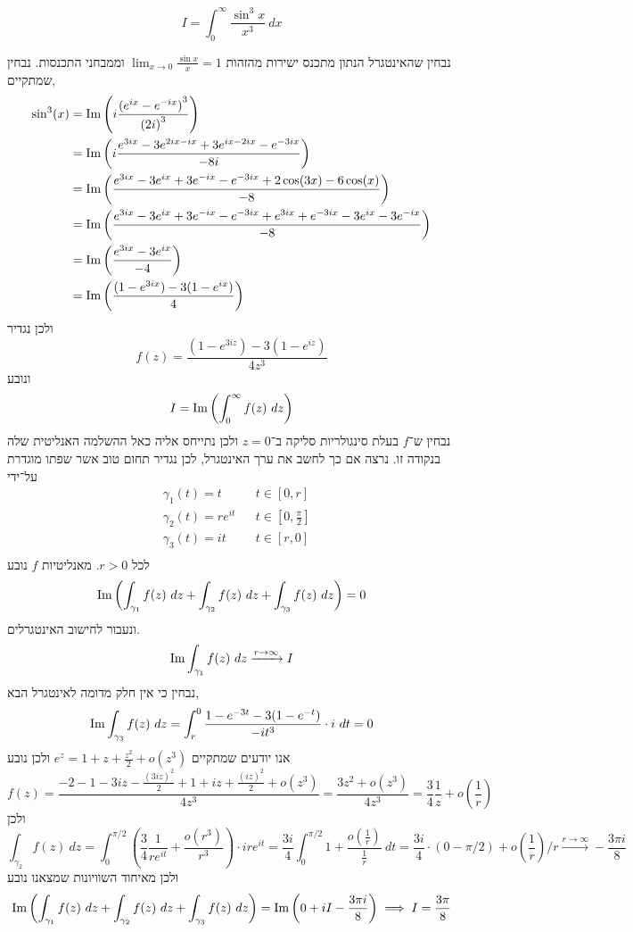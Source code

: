 \subquestion{}
\[
	I = \int_{0}^{\infty} \frac{\sin^3 x}{x^3}\ dx
\]
\begin{solution}
	נבחין שהאינטגרל הנתון מתכנס ישירות מהזהות $\lim_{x \to 0} \frac{\sin x}{x} = 1$ וממבחני התכנסות.
	נבחין שמתקיים,
	\begin{align*}
		\sin^3(x)
		& = \operatorname{Im}\left(i \frac{{(e^{ix} - e^{-ix})}^3}{{(2i)}^3}\right) \\
		& = \operatorname{Im}\left(i \frac{e^{3ix} - 3e^{2ix - ix} + 3e^{ix - 2 ix} - e^{-3ix}}{-8i}\right) \\
		& = \operatorname{Im}\left(\frac{e^{3ix} - 3e^{ix} + 3e^{-ix} - e^{-3ix} + 2\cos(3x) - 6\cos(x)}{-8}\right) \\
		& = \operatorname{Im}\left(\frac{e^{3ix} - 3e^{ix} + 3e^{-ix} - e^{-3ix} + e^{3ix} + e^{-3ix} - 3e^{ix} - 3e^{-ix}}{-8}\right) \\
		& = \operatorname{Im}\left(\frac{e^{3ix} - 3e^{ix}}{-4}\right) \\
		& = \operatorname{Im}\left(\frac{(1 - e^{3ix}) - 3(1 - e^{ix})}{4}\right) \\
	\end{align*}
	ולכן נגדיר
	\[
		f(z)
		= \frac{(1 - e^{3iz}) - 3(1 - e^{iz})}{4z^3}
	\]
	ונובע
	\[
		I = \im\left(\int_0^\infty f(z)\ dz\right)
	\]
	נבחין ש־$f$ בעלת סינגולריות סליקה ב־$z = 0$ ולכן נתייחס אליה כאל ההשלמה האנליטית שלה בנקודה זו.
	נרצה אם כך לחשב את ערך האינטגרל, לכן נגדיר תחום טוב אשר שפתו מוגדרת על־ידי
	\begin{align*}
		& \gamma_1(t) = t && t \in [0, r] \\
		& \gamma_2(t) = r e^{it} && t \in [0, \frac{\pi}{2}] \\
		& \gamma_3(t) = it && t \in [r, 0] \\
	\end{align*}
	לכל $r > 0$.
	מאנליטיות $f$ נובע
	\[
		\operatorname{Im}\left( \int_{\gamma_1} f(z)\ dz + \int_{\gamma_2} f(z)\ dz + \int_{\gamma_3} f(z)\ dz \right) = 0
	\]
	ונעבור לחישוב האינטגרלים.
	\[
		\operatorname{Im} \int_{\gamma_1} f(z)\ dz
		\xrightarrow{r \to \infty} I
	\]
	נבחין כי אין חלק מדומה לאינטגרל הבא,
	\[
		\operatorname{Im} \int_{\gamma_3} f(z)\ dz
		= \int_{r}^{0} \frac{1 - e^{-3t} - 3(1 - e^{-t})}{-it^3} \cdot i\ dt
		= 0
	\]
	אנו יודעים שמתקיים $e^z = 1 + z + \frac{z^2}{2} + o(z^3)$ ולכן נובע
	\[
		f(z)
		= \frac{-2 - 1 - 3iz - \frac{{(3iz)}^2}{2} + 1 + iz + \frac{{(iz)}^2}{2} + o(z^3)}{4z^3}
		= \frac{3z^2 + o(z^3)}{4z^3}
		= \frac{3}{4} \frac{1}{z} + o(\frac{1}{r})
	\]
	ולכן
	\[
		\int_{\gamma_2} f(z)\ dz
		= \int_0^{\pi/2} (\frac{3}{4} \frac{1}{r e^{it}} + \frac{o(r^3)}{r^3}) \cdot ire^{it}
		= \frac{3i}{4} \int_0^{\pi/2} 1 + \frac{o(\frac{1}{r})}{\frac{1}{r}}\ dt
		= \frac{3i}{4} \cdot (0 - \pi/2) + o(\frac{1}{r})/r
		\xrightarrow{r \to \infty} -\frac{3\pi i}{8}
	\]
	ולכן מאיחוד השוויונות שמצאנו נובע
	\[
		\operatorname{Im}\left( \int_{\gamma_1} f(z)\ dz + \int_{\gamma_2} f(z)\ dz + \int_{\gamma_3} f(z)\ dz \right)
		= \operatorname{Im} \left( 0 + iI - \frac{3\pi i}{8} \right)
		\implies I = \frac{3\pi}{8}
	\]
\end{solution}

